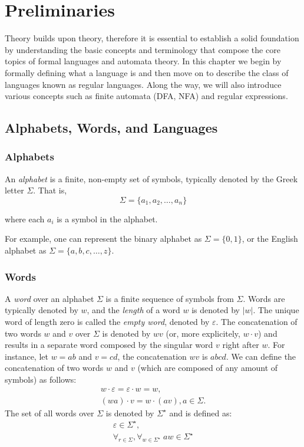 \chapter{Preliminaries}\label{chap:prelim}
Theory builds upon theory, therefore it is essential to establish a solid foundation by understanding the basic concepts and terminology that compose the core topics of formal languages and automata theory.
In this chapter we begin by formally defining what a language is and then move on to describe the class of languages known as regular languages.
Along the way, we will also introduce various concepts such as finite automata (DFA, NFA) and regular expressions.

\section{Alphabets, Words, and Languages}
\subsection*{Alphabets}

An \emph{alphabet} is a finite, non-empty set of symbols, typically denoted by the Greek letter $\Sigma$. That is,
\[
\Sigma = \{ a_1, a_2, \dots, a_n \}
\]

\noindent where each $a_i$ is a symbol in the alphabet.

For example, one can represent the binary alphabet as $\Sigma = \{ 0, 1 \}$, or the English alphabet as $\Sigma = \{ a, b, c, \ldots, z \}$.

\subsection*{Words}

A \emph{word} over an alphabet $\Sigma$ is a finite sequence of symbols from $\Sigma$. Words are typically denoted by $w$, and the \emph{length} of a word $w$ is denoted by $|w|$.
The unique word of length zero is called the \emph{empty word}, denoted by $\varepsilon$.
The concatenation of two words $w$ and $v$ over $\Sigma$ is denoted by $wv$ (or, more explicitely, $w \cdot v$) and results in a separate word composed by the singular word $v$ right after $w$. For instance, let $w = ab$ and $v = cd$, the concatenation $wv$ is $abcd$. We can define the concatenation of two words $w$ and $v$ (which are composed of any amount of symbols) as follows: %
\begin{gather*}
	w \cdot \varepsilon = \varepsilon \cdot w = w, \\
	(wa) \cdot v = w \cdot (av), a \in \Sigma.
\end{gather*}
The set of all words over $\Sigma$ is denoted by $\Sigma^{\star}$ and is defined as:
\begin{gather*}
	\varepsilon \in \Sigma^\star, \\
	\forall_{r \in \Sigma}, \forall_{w \in \Sigma^{\star}} \; aw \in \Sigma^\star
\end{gather*}


